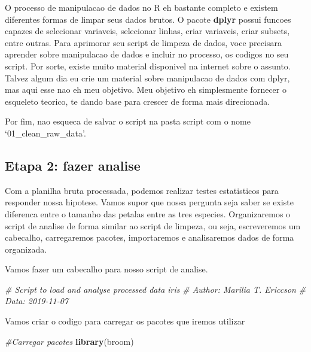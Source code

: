 \documentclass[
]{book}
\newenvironment{Shaded}{\begin{snugshade}}{\end{snugshade}}
\newcommand{\CommentTok}[1]{\textcolor[rgb]{0.56,0.35,0.01}{\textit{#1}}}
\newcommand{\FunctionTok}[1]{\textcolor[rgb]{0.13,0.29,0.53}{\textbf{#1}}}
\newcommand{\NormalTok}[1]{#1}
\begin{document}
O processo de manipulacao de dados no R eh bastante completo e existem diferentes formas de limpar seus dados brutos. O pacote \textbf{dplyr} possui funcoes capazes de selecionar variaveis, selecionar linhas, criar variaveis, criar subsets, entre outras. Para aprimorar seu script de limpeza de dados, voce precisara aprender sobre manipulacao de dados e incluir no processo, os codigos no seu script. Por sorte, existe muito material disponivel na internet sobre o assunto. Talvez algum dia eu crie um material sobre manipulacao de dados com dplyr, mas aqui esse nao eh meu objetivo. Meu objetivo eh simplesmente fornecer o esqueleto teorico, te dando base para crescer de forma mais direcionada.

Por fim, nao esqueca de salvar o script na pasta script com o nome `01\_clean\_raw\_data'.

\hypertarget{etapa-2-fazer-analise}{%
\subsection{Etapa 2: fazer analise}\label{etapa-2-fazer-analise}}

Com a planilha bruta processada, podemos realizar testes estatisticos para responder nossa hipotese. Vamos supor que nossa pergunta seja saber se existe diferenca entre o tamanho das petalas entre as tres especies. Organizaremos o script de analise de forma similar ao script de limpeza, ou seja, escreveremos um cabecalho, carregaremos pacotes, importaremos e analisaremos dados de forma organizada.

Vamos fazer um cabecalho para nosso script de analise.

\begin{Shaded}
\begin{Highlighting}[]

\CommentTok{\# Script to load and analyse processed data iris}
\CommentTok{\# Author: Marilia T. Ericcson}
\CommentTok{\# Data: 2019{-}11{-}07}
\end{Highlighting}
\end{Shaded}

Vamos criar o codigo para carregar os pacotes que iremos utilizar

\begin{Shaded}
\begin{Highlighting}[]

\CommentTok{\#Carregar pacotes}
\FunctionTok{library}\NormalTok{(broom)}
\end{Highlighting}
\end{Shaded}
\end{document}

